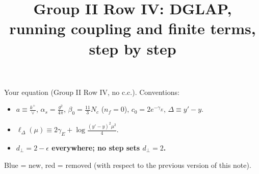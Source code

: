 \documentclass[10pt]{article}
\title{Group II Row IV: DGLAP, running coupling and finite terms, step by step}
\date{}
\numberwithin{equation}{section}
\newcommand{\new}[1]{{\color{blue}#1}}
\newcommand{\old}[1]{{\color{red}#1}}
\begin{document}
\maketitle
\noindent Your equation (Group II Row IV, no c.c.). Conventions:
\begin{itemize}
\item $a\equiv\frac{k^+}{\vee}$, $\alpha_s=\frac{g^2}{4\pi}$, $\beta_0=\frac{11}{3}N_c$ ($n_f=0$), $c_0=2e^{-\gamma_E}$, $\Delta\equiv y'-y$.
\item $\ell_\Delta(\mu)\equiv2\gamma_E+\log\frac{(y'-y)^2\mu^2}{4}$.
\item \textbf{$d_\perp=2-\epsilon$ everywhere; no step sets $d_\perp=2$.}
\end{itemize}
\new{Blue} = new, \old{red} = removed (with respect to the previous version of this note).
\end{document}
